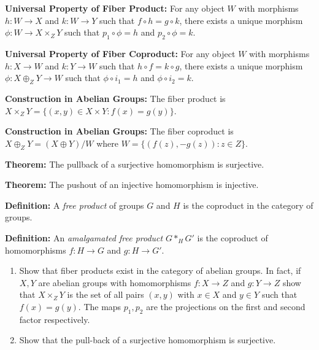 \textbf{Universal Property of Fiber Product:} For any object $W$ with morphisms $h: W \to X$ and $k: W \to Y$ such that $f \circ h = g \circ k$, there exists a unique morphism $\phi: W \to X \times_Z Y$ such that $p_1 \circ \phi = h$ and $p_2 \circ \phi = k$.

\textbf{Universal Property of Fiber Coproduct:} For any object $W$ with morphisms $h: X \to W$ and $k: Y \to W$ such that $h \circ f = k \circ g$, there exists a unique morphism $\phi: X \oplus_Z Y \to W$ such that $\phi \circ i_1 = h$ and $\phi \circ i_2 = k$.

\textbf{Construction in Abelian Groups:} The fiber product is $X \times_Z Y = \{(x,y) \in X \times Y : f(x) = g(y)\}$.

\textbf{Construction in Abelian Groups:} The fiber coproduct is $X \oplus_Z Y = (X \oplus Y)/W$ where $W = \{(f(z), -g(z)) : z \in Z\}$.

\textbf{Theorem:} The pullback of a surjective homomorphism is surjective.

\textbf{Theorem:} The pushout of an injective homomorphism is injective.

\textbf{Definition:} A \textit{free product} of groups $G$ and $H$ is the coproduct in the category of groups.

\textbf{Definition:} An \textit{amalgamated free product} $G *_H G'$ is the coproduct of homomorphisms $f: H \to G$ and $g: H \to G'$.

\begin{problembox}
\begin{enumerate}[label=(\alph*)]
\item Show that fiber products exist in the category of abelian groups. In fact, if $X, Y$ are abelian groups with homomorphisms $f: X \rightarrow Z$ and $g: Y \rightarrow Z$ show that $X \times_Z Y$ is the set of all pairs $(x, y)$ with $x \in X$ and $y \in Y$ such that $f(x) = g(y)$. The maps $p_1, p_2$ are the projections on the first and second factor respectively.
\item Show that the pull-back of a surjective homomorphism is surjective.
\end{enumerate}
\end{problembox}

